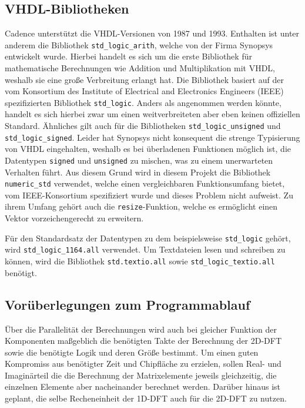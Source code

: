  
 
 \subsection{VHDL-Bibliotheken}
 Cadence unterstützt die VHDL-Versionen von 1987 und 1993. 
 Enthalten ist unter anderem die Bibliothek \texttt{std\_logic\_arith}, welche von der Firma Synopsys entwickelt wurde. Hierbei handelt es sich um die erste Bibliothek
 für mathematische Berechnungen wie Addition und Multiplikation mit VHDL, weshalb sie eine große Verbreitung erlangt hat.
 Die Bibliothek basiert auf der vom Konsortium des Institute of Electrical and Electronics Engineers (IEEE) spezifizierten Bibliothek \texttt{std\_logic}. Anders als angenommen werden könnte, handelt es sich hierbei zwar um einen weitverbreiteten aber eben keinen offiziellen Standard.
 Ähnliches gilt auch für die Bibliotheken \texttt{std\_logic\_unsigned} und \texttt{std\_logic\_signed}.
 Leider hat Synopsys nicht konsequent die strenge Typisierung von VHDL eingehalten, weshalb es bei überladenen Funktionen möglich ist, die Datentypen \texttt{signed} und \texttt{unsigned} zu mischen, was zu einem unerwarteten Verhalten führt.
 Aus diesem Grund wird in diesem Projekt die Bibliothek \texttt{numeric\_std} verwendet, welche einen vergleichbaren Funktionsumfang bietet, vom IEEE-Konsortium spezifiziert wurde und dieses Problem nicht aufweist. Zu ihrem 
 Umfang gehört auch die \texttt{resize}-Funktion, welche es ermöglicht einen Vektor vorzeichengerecht zu erweitern.
 
Für den Standardsatz der Datentypen zu dem beispielsweise \texttt{std\_logic} gehört, wird 
\texttt{std\_logic\_1164.all} verwendet.
Um Textdateien lesen und schreiben zu können, wird die Bibliothek \texttt{std.textio.all} sowie 
\texttt{std\_logic\_textio.all} benötigt.

 
\subsection{Vorüberlegungen zum Programmablauf}\label{sec:VorueberlegungenProgrammablauf}
Über die Parallelität der Berechnungen wird auch bei gleicher Funktion der Komponenten maßgeblich die benötigten Takte der Berechnung der 2D-DFT sowie die benötigte
Logik und deren Größe bestimmt. 
Um einen guten Kompromiss aus benötigter Zeit und Chipfläche zu erzielen,
sollen  Real- und Imaginärteil die die Berechnung der Matrixelemente jeweils gleichzeitig, die einzelnen Elemente aber nacheinander berechnet werden. Darüber hinaus ist geplant, die selbe Recheneinheit der 1D-DFT auch für die 2D-DFT zu nutzen. 


